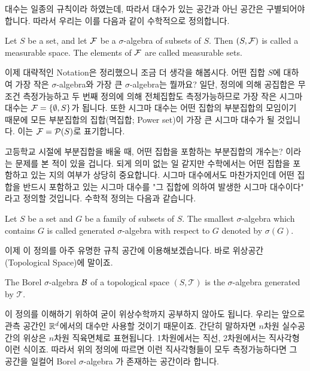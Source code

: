 \documentclass[final]{IEEEphot}
\begin{document}
 \HS 대수는 일종의 규칙이라 하였는데, 따라서 대수가 있는 공간과 아닌 공간은 구별되어야 합니다. 따라서 우리는 이를 다음과 같이 수학적으로 정의합니다.
 
  \begin{definition}
    Let $S$ be a set, and let $\mathcal{F}$ be a $\sigma$-algebra of subsets of $S$. Then $(S, \mathcal{F})$ is called a measurable space. The elements of $\mathcal{F}$ are called measurable sets.
    
    \HL
 \end{definition}

이제 대략적인 Notation은 정리했으니 조금 더 생각을 해봅시다. 어떤 집합 $S$에 대하여 가장 작은 $\sigma$-algebra와 가장 큰 $\sigma$-algebra는 뭘까요? 일단, 정의에 의해 공집합은 무조건 측정가능하고 두 번째 정의에 의해 전체집합도 측정가능하므로 가장 작은 시그마대수는 $\mathcal{F} = \{\emptyset, S\}$가 됩니다. 또한 시그마 대수는 어떤 집합의 부분집합의 모임이기 때문에 모든 부분집합의 집합(멱집합; Power set)이 가장 큰 시그마 대수가 될 것입니다. 이는 $\mathcal{F} = \mathcal{P}(S)$로 표기합니다.

고등학교 시절에 부분집합을 배울 때, 어떤 집합을 포함하는 부분집합의 개수는? 이라는 문제를 본 적이 있을 겁니다. 되게 의미 없는 일 같지만 수학에서는 어떤 집합을 포함하고 있는 지의 여부가 상당히 중요합니다. 시그마 대수에서도 마찬가지인데 어떤 집합을 반드시 포함하고 있는 시그마 대수를 "그 집합에 의하여 발생한 시그마 대수이다" 라고 정의할 것입니다. 수학적 정의는 다음과 같습니다.

\begin{definition}
 Let $S$ be a set and $G$ be a family of subsets of $S$. The smallest $\sigma$-algebra which contains $G$ is called generated $\sigma$-algebra with respect to $G$ denoted by $\sigma(G)$.
 
 \HL
\end{definition}

 이제 이 정의를 아주 유명한 규칙 공간에 이용해보겠습니다. 바로 위상공간(Topological Space)에 말이죠.
 
 \newpage

 \begin{definition}
  The Borel $\sigma$-algebra $\mathcal{B}$ of a topological space $(S,\mathcal{T})$ is the $\sigma$-algebra generated by $\mathcal{T}$.

  \HL
 \end{definition}

이 정의를 이해하기 위하여 굳이 위상수학까지 공부하지 않아도 됩니다. 우리는 앞으로 관측 공간인 $\mathbb{R}^d$에서의 대수만 사용할 것이기 때문이죠. 간단히 말하자면 $n$차원 실수공간의 위상은 $n$차원 직육면체로 표현됩니다. 1차원에서는 직선, 2차원에서는 직사각형 이런 식이죠. 따라서 위의 정의에 따르면 이런 직사각형들이 모두 측정가능하다면 그 공간을 일컬어 Borel $\sigma$-algebra 가 존재하는 공간이라 합니다. 
\end{document}
